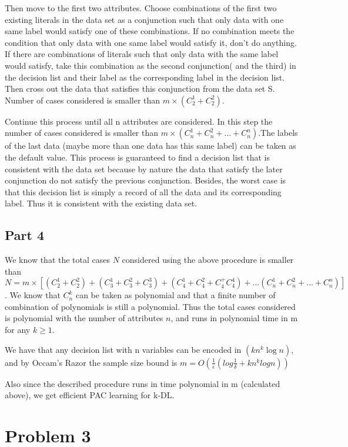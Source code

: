 Then move to the first two attributes. Choose combinations of the first two existing literals in the data set as a conjunction such that only data with one same label would satisfy one of these combinations. If no combination meets the condition that only data with one same label would satisfy it, don't do anything. If there are combinations of literals such that only data with the same label would satisfy, take this combination as the second conjunction( and the third) in the decision list and their label as the corresponding label in the decision list. Then cross out the data that satisfies this conjunction from the data set S. Number of cases considered is smaller than $m\times (C_2^1+C_2^2)$. 

Continue this process until all n attributes are considered. In this step the number of cases considered is smaller than $m\times(C_n^1+C_n^2+\ldots+C_n^n)$.The labels of the last data (maybe more than one data has this same label) can be taken as the default value. This process is guaranteed to find a decision list that is consistent with the data set because by nature the data that satisfy the later conjunction do not satisfy the previous conjunction. Besides, the worst case is that this decision list is simply a record of all the data and its corresponding label. Thus it is consistent with the existing data set. 


\subsection{Part 4}
We know that the total cases $N$ considered using the above procedure is smaller than $N=m\times[(C_2^1+C_2^2)+(C_3^1+C_3^2+C_3^3)+(C_4^1+C_4^2+C_4^+C_4^4)+\ldots(C_n^1+C_n^2+\ldots+C_n^n)]$. We know that $C_n^k$ can be taken as polynomial and that a finite number of combination of polynomials is still a polynomial. Thus the total cases considered is polynomial with the number of attributes $n$, and runs in polynomial time in m for any $k\geq 1$. 

We have that any decision list with n variables can be encoded in $(kn^k\log{n})$, and by Occam's Razor the sample size bound is $m=O(\frac{1}{\epsilon}(log{\frac{1}{\delta}}+kn^klog{n}))$

Also since the described procedure runs in time polynomial in m (calculated above), we get efficient PAC learning for k-DL. 

\section{Problem 3}
